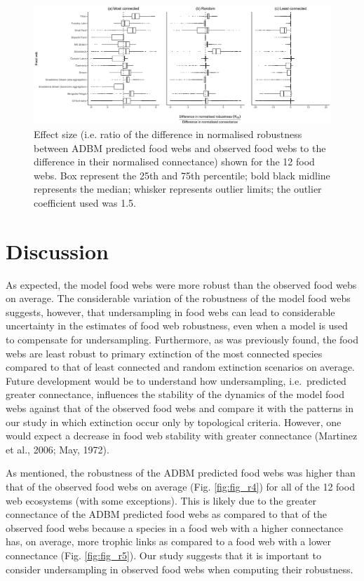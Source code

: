 \documentclass{article}
\begin{document}
\begin{figure}

{\centering \includegraphics[width=450px]{../results/plot_R50_slope} 

}

\caption{\label{fig:fig_r5} Effect size (i.e. ratio of the difference in normalised robustness between ADBM predicted food webs and observed food webs to the difference in their normalised connectance) shown for the 12 food webs. Box represent the 25th and 75th percentile; bold black midline represents the median; whisker represents outlier limits; the outlier coefficient used was 1.5.}\label{fig:unnamed-chunk-3}
\end{figure}

\hypertarget{discussion}{%
\section{Discussion}\label{discussion}}

As expected, the model food webs were more robust than the observed food
webs on average. The considerable variation of the robustness of the
model food webs suggests, however, that undersampling in food webs can
lead to considerable uncertainty in the estimates of food web
robustness, even when a model is used to compensate for undersampling.
Furthermore, as was previously found, the food webs are least robust to
primary extinction of the most connected species compared to that of
least connected and random extinction scenarios on average. Future
development would be to understand how undersampling, i.e.~predicted
greater connectance, influences the stability of the dynamics of the
model food webs against that of the observed food webs and compare it
with the patterns in our study in which extinction occur only by
topological criteria. However, one would expect a decrease in food web
stability with greater connectance (Martinez et al., 2006; May, 1972).

As mentioned, the robustness of the ADBM predicted food webs was higher
than that of the observed food webs on average (Fig. \ref{fig:fig_r4})
for all of the 12 food web ecosystems (with some exceptions). This is
likely due to the greater connectance of the ADBM predicted food webs as
compared to that of the observed food webs because a species in a food
web with a higher connectance has, on average, more trophic links as
compared to a food web with a lower connectance (Fig. \ref{fig:fig_r5}).
Our study suggests that it is important to consider undersampling in
observed food webs when computing their robustness.
\end{document}
